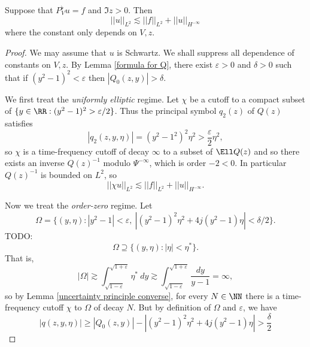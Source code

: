 \begin{lemma}
Suppose that $P_V^\flat u = f$ and $\Im z > 0$. Then
\begin{equation}
\label{regularity}
||u||_{L^2} \lesssim ||f||_{L^2} + ||u||_{H^{-\infty}}
\end{equation}
where the constant only depends on $V,z$.
\end{lemma}
\begin{proof}
We may assume that $u$ is Schwartz. We shall suppress all dependence of constants on $V,z$.
By Lemma \ref{formula for Q}, there exist $\varepsilon > 0$ and $\delta > 0$ such that if $(y^2 - 1)^2 < \varepsilon$ then $|Q_0(z, y)| > \delta$.

We first treat the \emph{uniformly elliptic} regime.
Let $\chi$ be a cutoff to a compact subset of $\{y \in \RR: (y^2 - 1)^2 > \varepsilon/2\}$.
Thus the principal symbol $q_2(z)$ of $Q(z)$ satisfies
$$|q_2(z, y, \eta)| = (y^2 - 1^2)^2\eta^2 > \frac{\varepsilon}{2} \eta^2,$$
so $\chi$ is a time-frequency cutoff of decay $\infty$ to a subset of $\Ell Q(z)$ and so there exists an inverse $Q(z)^{-1}$ modulo $\Psi^{-\infty}$, which is order $-2 < 0$.
In particular $Q(z)^{-1}$ is bounded on $L^2$, so
$$||\chi u||_{L^2} \lesssim ||f||_{L^2} + ||u||_{H^{-\infty}}.$$

Now we treat the \emph{order-zero} regime.
Let
$$\Omega = \{(y, \eta): |y^2 - 1| < \varepsilon, ~|(y^2 - 1)^2\eta^2 + 4j(y^2 - 1)\eta| < \delta/2\}.$$
TODO:
$$\Omega \supseteq \{(y, \eta): |\eta| < \eta^*\}.$$
That is,
$$|\Omega| \gtrsim \int_{\sqrt{1 - \varepsilon}}^{\sqrt{1 + \varepsilon}} \eta^* ~dy \gtrsim \int_{\sqrt{1 - \varepsilon}}^{\sqrt{1 + \varepsilon}} \frac{dy}{y - 1} = \infty,$$
so by Lemma \ref{uncertainty principle converse}, for every $N \in \NN$ there is a time-frequency cutoff $\chi$ to $\Omega$ of decay $N$.
But by definition of $\Omega$ and $\varepsilon$, we have
$$|q(z, y, \eta)| \geq |Q_0(z, y)| - |(y^2 - 1)^2\eta^2 + 4j(y^2 - 1)\eta| > \frac{\delta}{2}$$




\end{proof}
